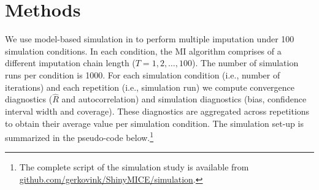 \documentclass[article]{jss}
\begin{document}
% 
% 



\section{Methods} \label{sec:methods}

We use model-based simulation in  to perform multiple imputation under 100 simulation conditions. In each condition, the MI algorithm comprises of a different imputation chain length ($T = 1, 2, \dots, 100$). The number of simulation runs per condition is 1000. For each simulation condition (i.e., number of iterations) and each repetition (i.e., simulation run) we compute convergence diagnostics ($\widehat{R}$ and autocorrelation) and simulation diagnostics (bias, confidence interval width and coverage). These diagnostics are aggregated across repetitions to obtain their average value per simulation condition.
The simulation set-up is summarized in the pseudo-code below.\footnote{The complete  script of the simulation study is available from \href{https://github.com/gerkovink/shinyMice/simulation}{github.com/gerkovink/ShinyMICE/simulation}.}
\end{document}
